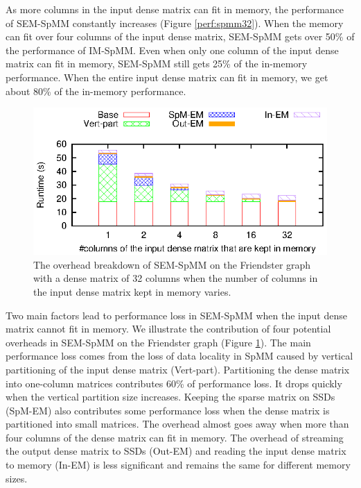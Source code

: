 As more columns in the input dense matrix can fit in memory, the performance
of SEM-SpMM constantly increases (Figure \ref{perf:spmm32}). When the memory
can fit over four columns of the input dense matrix, SEM-SpMM gets over 50\%
of the performance of IM-SpMM. Even when only one column of the input dense
matrix can fit in memory, SEM-SpMM still gets 25\% of the in-memory performance.
When the entire input dense matrix can fit in memory, we get about 80\% of
the in-memory performance.

\begin{figure}
	\begin{center}
		\footnotesize
		\includegraphics[scale=1]{SpMM_figs/spmm-32cols-overhead.eps}
		\caption{The overhead breakdown of SEM-SpMM on the Friendster
			graph with a dense matrix of 32 columns when the number
		of columns in the input dense matrix kept in memory varies. }
		\label{perf:spmm32_over}
	\end{center}
\end{figure}

Two main factors lead to performance loss in SEM-SpMM when the input dense matrix
cannot fit in memory. We illustrate the contribution of four potential overheads
in SEM-SpMM on the Friendster graph (Figure \ref{perf:spmm32_over}). The main
performance loss comes from the loss of data locality in SpMM caused by
vertical partitioning of the input dense matrix (Vert-part). Partitioning
the dense matrix into one-column matrices contributes 60\% of performance loss.
It drops quickly when the vertical
partition size increases. Keeping the sparse matrix on SSDs (SpM-EM)
also contributes some performance loss when the dense matrix is partitioned
into small matrices. The overhead almost goes away when more than four columns
of the dense matrix can fit in memory. The overhead of streaming the output dense
matrix to SSDs (Out-EM) and reading the input dense matrix to memory (In-EM)
is less significant and remains the same for different memory sizes.

